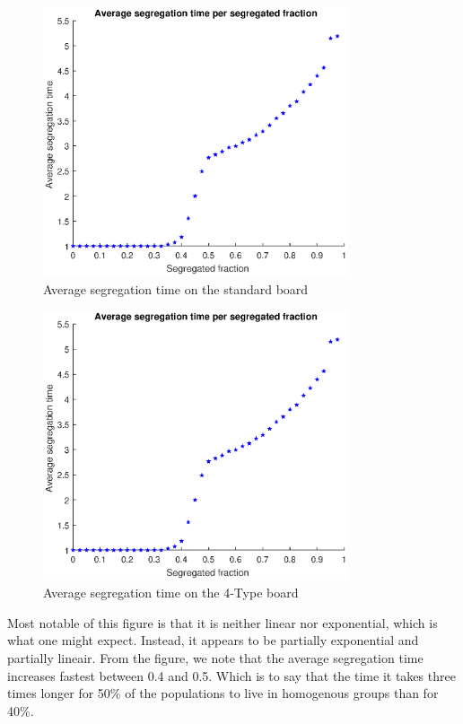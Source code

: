 \documentclass{article}
\begin{document}
\begin{figure}[h!]
    \centering
    \includegraphics[width=0.8\textwidth]{aveseg_sb_1}
    \caption{Average segregation time on the standard board}
    \label{fig:avesegsb}
\end{figure}
\begin{figure}[h!]
    \centering
    \includegraphics[width=0.8\textwidth]{aveseg_sb_1}
    \caption{Average segregation time on the 4-Type board}
    \label{fig:aveseg4b}
\end{figure}
Most notable of this figure is that it is neither linear nor exponential, which is what one might expect. Instead, it appears to be partially exponential and partially lineair. From the figure, we note that the average segregation time increases fastest between 0.4 and 0.5. 
Which is to say that the time it takes three times longer for 50\% of the populations to live in homogenous groups than for 40\%. 
\newpage
\end{document}
